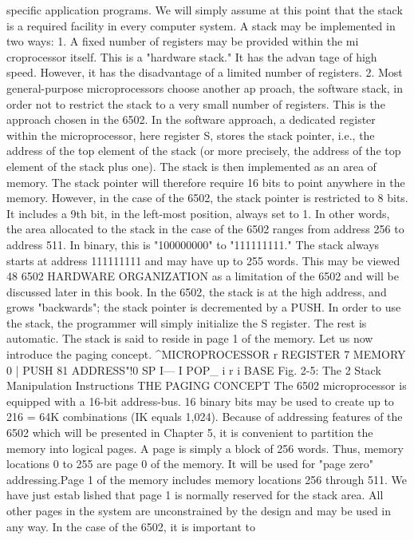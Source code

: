 \documentclass{book}
\begin{document}
specific application programs.
We will simply assume at this point that the stack is a required
facility in every computer system. A stack may be implemented
in two ways:
1. A fixed number of registers may be provided within the mi
croprocessor itself. This is a "hardware stack." It has the advan
tage of high speed. However, it has the disadvantage of a limited
number of registers.
2. Most general-purpose microprocessors choose another ap
proach, the software stack, in order not to restrict the stack to
a very small number of registers. This is the approach chosen in
the 6502. In the software approach, a dedicated register within
the microprocessor, here register S, stores the stack pointer, i.e.,
the address of the top element of the stack (or more precisely, the
address of the top element of the stack plus one). The stack is then
implemented as an area of memory. The stack pointer will therefore
require 16 bits to point anywhere in the memory.
However, in the case of the 6502, the stack pointer is restricted
to 8 bits. It includes a 9th bit, in the left-most position, always set
to 1. In other words, the area allocated to the stack in the case of
the 6502 ranges from address 256 to address 511. In binary, this is
"100000000" to "111111111." The stack always starts at address
111111111 and may have up to 255 words. This may be viewed
48
6502 HARDWARE ORGANIZATION
as a limitation of the 6502 and will be discussed later in this book.
In the 6502, the stack is at the high address, and grows
"backwards"; the stack pointer is decremented by a PUSH.
In order to use the stack, the programmer will simply initialize
the S register. The rest is automatic.
The stack is said to reside in page 1 of the memory. Let us now
introduce the paging concept.
^MICROPROCESSOR
r REGISTER
7 MEMORY 0
| PUSH
81 ADDRESS"!0
SP I—
I POP_
i r
i
BASE
Fig. 2-5: The 2 Stack Manipulation Instructions
THE PAGING CONCEPT
The 6502 microprocessor is equipped with a 16-bit address-bus.
16 binary bits may be used to create up to 216 = 64K combinations
(IK equals 1,024). Because of addressing features of the 6502
which will be presented in Chapter 5, it is convenient to partition
the memory into logical pages. A page is simply a block of 256
words. Thus, memory locations 0 to 255 are page 0 of the memory.
It will be used for "page zero" addressing.Page 1 of the memory
includes memory locations 256 through 511. We have just estab
lished that page 1 is normally reserved for the stack area. All
other pages in the system are unconstrained by the design and
may be used in any way. In the case of the 6502, it is important to
\end{document}
